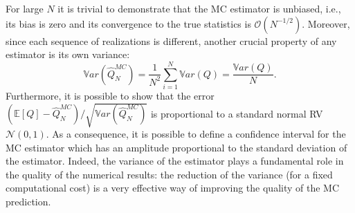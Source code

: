 For large $N$ it is trivial to demonstrate that the MC estimator is unbiased, i.e., its bias is zero and its convergence
to the true statistics is $\mathcal{O}(N^{-1/2})$. Moreover, since each sequence of realizations is different, another crucial property 
of any estimator is its own variance:
\begin{equation}\label{EQ: variance MC}
 \mathbb{V}ar\left( \hat{Q}_N^{MC} \right)  = \dfrac{1}{N^2} \sum_{i=1}^{N} \mathbb{V}ar\left( Q \right) 
            = \dfrac{\mathbb{V}ar\left(Q\right) }{N}.
\end{equation}
Furthermore, it is possible to show that the error $\left( \mathbb{E}\left[Q\right] - \hat{Q}_N^{MC} \right)/\sqrt{ \mathbb{V}ar\left( \hat{Q}_N^{MC} \right) }$ is proportional to 
a standard normal RV $\mathcal{N}(0,1)$. As a consequence, it is possible to define a confidence
interval for the MC estimator which has an amplitude proportional to the standard deviation of the estimator.
Indeed, the variance of the estimator plays a fundamental role in the quality of the
numerical results: the reduction of the variance (for a fixed computational cost) 
is a very effective way of improving the quality of the MC prediction. 

